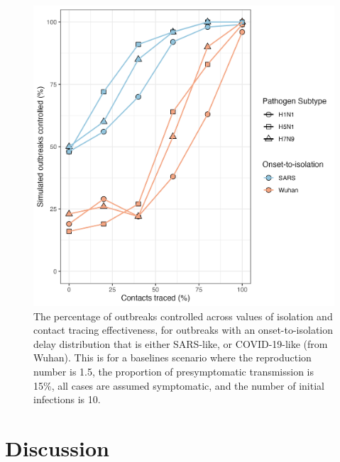 \documentclass{article}
\begin{document}
\clearpage

\begin{figure}[ht]
\centering
\includegraphics[width=\textwidth]{../plots/prop_outbreak_control_onset_to_isolation.png}
\caption{The percentage of outbreaks controlled across values of isolation and contact tracing effectiveness, for outbreaks with an onset-to-isolation delay distribution that is either SARS-like, or COVID-19-like (from Wuhan). This is for a baselines scenario where the reproduction number is 1.5, the proportion of presymptomatic transmission is 15\%, all cases are assumed symptomatic, and the number of initial infections is 10.}
\label{fig:prop-outbreak-control-onset-to-isolation}
\end{figure}

\section*{Discussion}
\end{document}
